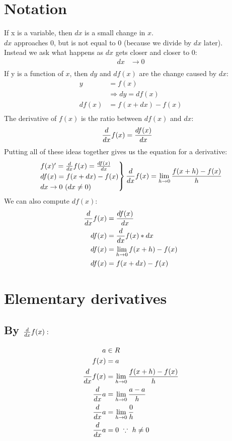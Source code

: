 \documentclass[a4paper,14pt,twoside]{book}
\begin{document}
{\section{Notation}
If x is a variable, then $dx$ is a small change in $x$. \\
$dx$ approaches $0$, but is not equal to $0$ (because we divide by $dx$ later). \\
Instead we ask what happens as $dx$ gets closer and closer to $0:$ \\
\begin{align*}
	dx & \to 0 \\
\end{align*}
If y is a function of $x$, then $dy$ and $df(x)$ are the change caused by $dx:$
\begin{align*}
	y     & = f(x)                 \\
	      & \Rightarrow dy = df(x) \\
	df(x) & = f(x+dx) - f(x)       \\
\end{align*}
The derivative of $f(x)$ is the ratio between $df(x)$ and $dx:$
\begin{align*}
	\frac{d}{dx} f(x) & = \frac{df(x)}{dx}
\end{align*}
Putting all of these ideas together gives us the equation for a derivative$:$
\begin{align*}
	\begin{rcases*}
		f(x)' = \D f(x) = \DD{f(x)}{x} \\
		df(x) = f(x+dx) - f(x) \\
		dx \to 0\ (dx \ne 0)
	\end{rcases*}
	\D f(x) = \LIM{h}{0} \F{f(x+h)-f(x)}{h}
\end{align*}
We can also compute $df(x):$
\begin{align*}
	\frac{d}{dx} f(x) & = \frac{df(x)}{dx}            \\
	df(x)   & = \frac{d}{dx} f(x) * dx             \\
	df(x)   & = \lim_{h \to 0} f(x+h) - f(x) \\
	df(x)   & = f(x+dx) - f(x)
\end{align*}
\section{Elementary derivatives}
\subsection{By $\frac{d}{dx} f(x):$}
\begin{align*}
	a       & \in R                             \\
	f(x)    & = a                               \\
	\frac{d}{dx} f(x) & = \lim_{h \to 0} \frac{f(x+h) - f(x)}{h} \\
	\frac{d}{dx} a    & = \lim_{h \to 0} \frac{a-a}{h}           \\
	\frac{d}{dx} a    & = \lim_{h \to 0} \frac{0}{h}             \\
	\frac{d}{dx} a    & = 0\ \because\ h \ne 0
\end{align*}
}
\end{document}
